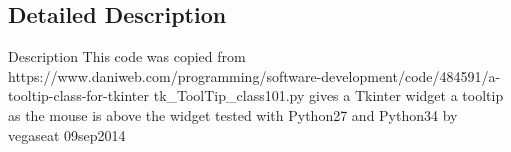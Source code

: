 \subsection{Detailed Description}
\begin{DoxyVerb}Description
This code was copied from https://www.daniweb.com/programming/software-development/code/484591/a-tooltip-class-for-tkinter
tk_ToolTip_class101.py
gives a Tkinter widget a tooltip as the mouse is above the widget
tested with Python27 and Python34  by  vegaseat  09sep2014
\end{DoxyVerb}
 